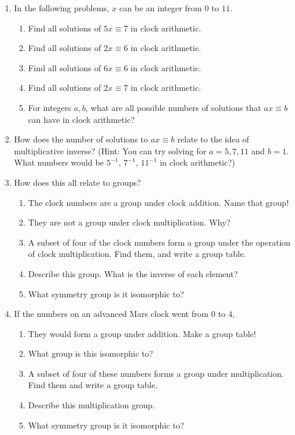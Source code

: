 \documentclass[../gatm.tex]{subfiles}
\begin{document}
\begin{enumerate}
\setcounter{enumi}{\value{problem_i}}
\item In the following problems, $x$ can be an integer from $0$ to $11$.
\begin{enumerate}
\item Find all solutions of $5x\equiv 7$ in clock arithmetic.
\item Find all solutions of $2x\equiv 6$ in clock arithmetic.
\item Find all solutions of $6x\equiv 6$ in clock arithmetic.
\item Find all solutions of $2x\equiv 7$ in clock arithmetic.
\item For integers $a,b$, what are all possible numbers of solutions that $ax\equiv b$ can have in clock arithmetic?
\end{enumerate}
\item How does the number of solutions to $ax\equiv b$ relate to the idea of multiplicative inverse? (Hint: You can try solving for $a=5,7,11$ and $b=1$. What numbers would be $5^{-1}$, $7^{-1}$, $11^{-1}$ in clock arithmetic?)
\item How does this all relate to groups?
\begin{enumerate}
\item The clock numbers are a group under clock addition. Name that group!
\item They are not a group under clock multiplication. Why?
\item A subset of four of the clock numbers form a group under the operation of clock multiplication. Find them, and write a group table.
\item Describe this group. What is the inverse of each element?
\item What symmetry group is it isomorphic to?
\end{enumerate}
\item If the numbers on an advanced Mars clock went from $0$ to $4$,
\begin{enumerate}
\item They would form a group under addition. Make a group table!
\item What group is this isomorphic to?
\item A subset of four of these numbers forms a group under multiplication. Find them and write a group table.
\item Describe this multiplication group.
\item What symmetry group is it isomorphic to?
\end{enumerate}
\setcounter{problem_i}{\value{enumi}}
\end{enumerate}
\end{document}
